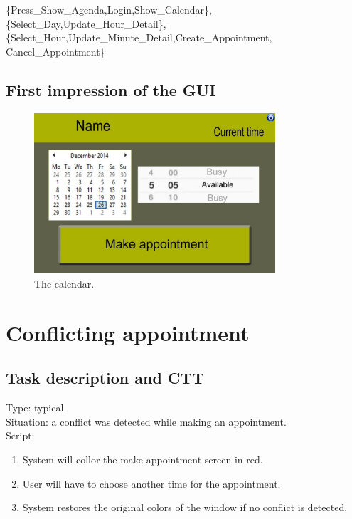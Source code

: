 \documentclass[11pt, a4paper,svglistings]{report}
\begin{document}
\{Press\_Show\_Agenda,Login,Show\_Calendar\},\{Select\_Day,Update\_Hour\_Detail\}, \\ \{Select\_Hour,Update\_Minute\_Detail,Create\_Appointment, Cancel\_Appointment\}


\subsection{First impression of the GUI}

\begin{figure}[H]
\centering
    \includegraphics[width=0.8\textwidth]{Calendar.jpg}
  \caption[The calendar]{\label{fig:ShowAgenda}The calendar.}
\end{figure}




\newpage

\section{Conflicting appointment}

\subsection{Task description and CTT}

\label{subsec:conflict}Type: typical \\
Situation: a conflict was detected while making an appointment. \\
Script:
\begin{enumerate}
\item System will collor the make appointment screen in red.
\item User will have to choose another time for the appointment.
\item System restores the original colors of the window if no conflict is detected.
\end{enumerate}
\end{document}

